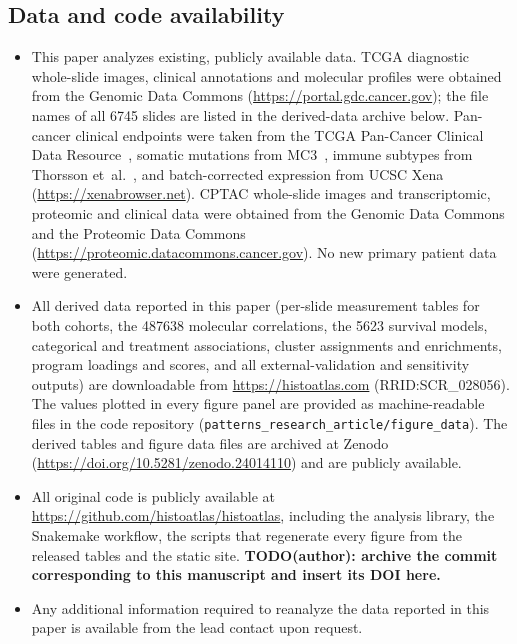 \subsection*{Data and code availability}
\begin{itemize}
\item This paper analyzes existing, publicly available data. TCGA diagnostic
      whole-slide images, clinical annotations and molecular profiles were
      obtained from the Genomic Data Commons (\url{https://portal.gdc.cancer.gov});
      the file names of all \num{6745} slides are listed in the derived-data
      archive below.
      Pan-cancer clinical endpoints were taken from the TCGA Pan-Cancer Clinical
      Data Resource~\cite{liu2018tcgacdr}, somatic mutations from
      MC3~\cite{ellrott2018mc3}, immune subtypes from Thorsson
      et~al.~\cite{thorsson2018immune}, and batch-corrected expression from UCSC
      Xena (\url{https://xenabrowser.net}). CPTAC whole-slide images and
      transcriptomic, proteomic and clinical data were obtained from the Genomic
      Data Commons and the Proteomic Data Commons
      (\url{https://proteomic.datacommons.cancer.gov}). No new primary patient data
      were generated.
\item All derived data reported in this paper (per-slide measurement tables for
      both cohorts, the \num{487638} molecular correlations, the \num{5623}
      survival models, categorical and treatment associations, cluster
      assignments and enrichments, program loadings and scores, and all
      external-validation and sensitivity outputs) are downloadable from
      \url{https://histoatlas.com} (RRID:SCR\_028056). The values plotted in every
      figure panel are provided as machine-readable files in the code repository
      (\texttt{patterns\_research\_article/figure\_data}). The derived tables
      and figure data files are archived at Zenodo
      (\href{https://doi.org/10.5281/zenodo.24014110}{https://doi.org/10.5281/zenodo.24014110})
      and are publicly available.
\item All original code is publicly available at
      \url{https://github.com/histoatlas/histoatlas}, including the analysis
      library, the Snakemake workflow, the scripts that regenerate every figure
      from the released tables and the static site. \textbf{TODO(author): archive the commit corresponding to this
      manuscript and insert its DOI here.}
\item Any additional information required to reanalyze the data reported in this
      paper is available from the lead contact upon request.
\end{itemize}

